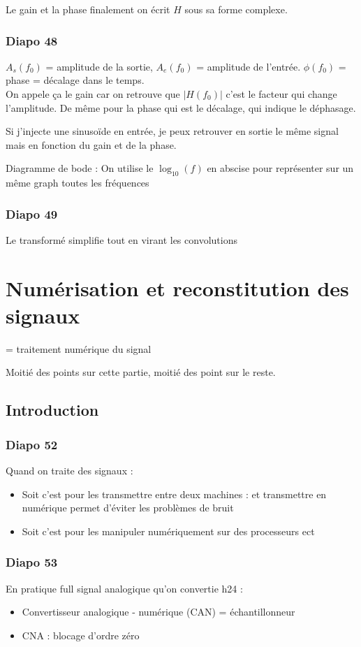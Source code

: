 \documentclass{article}
\theoremstyle{plain}%
\theoremstyle{definition}
\theoremstyle{remark}
\begin{document}
Le gain et la phase finalement on écrit $ H $ sous sa forme complexe.

\subsubsection{Diapo 48}

$ A_s(f_0) $ = amplitude de la sortie, $ A_e(f_0) $ = amplitude de l'entrée. $ \phi (f_0) $ = phase = décalage dans le temps. \\
On appele ça le gain car on retrouve que $ \left| H(f_0) \right| $  c'est le facteur qui change l'amplitude. De même pour la phase qui est le décalage, qui indique le déphasage.

Si j'injecte une sinusoïde en entrée, je peux retrouver en sortie le même signal mais en fonction du gain et de la phase.

Diagramme de bode : On utilise le $ \log_{10}(f)  $ en abscise pour représenter sur un même graph toutes les fréquences 

\subsubsection{Diapo 49}
Le transformé simplifie tout en virant les convolutions


\section{Numérisation et reconstitution des signaux}
= traitement numérique du signal 

Moitié des points sur cette partie, moitié des point sur le reste.
\subsection{Introduction}

\subsubsection{Diapo 52}
Quand on traite des signaux : \begin{itemize}
    \item Soit c'est pour les transmettre entre deux machines : et transmettre en numérique permet d'éviter les problèmes de bruit
    \item Soit c'est pour les manipuler numériquement sur des processeurs ect
\end{itemize}

\subsubsection{Diapo 53}
En pratique full signal analogique qu'on convertie h24 :
\begin{itemize}
    \item Convertisseur analogique - numérique (CAN) = échantillonneur
    \item CNA : blocage d'ordre zéro
\end{itemize}
\end{document}
